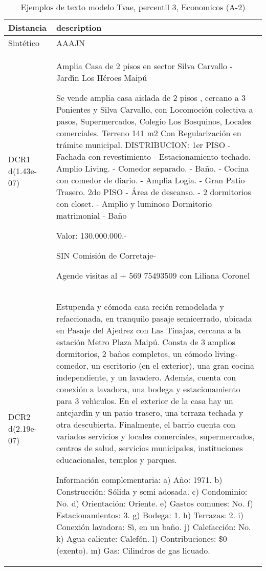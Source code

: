 \begin{table}[H]
\centering
\fontsize{10}{14}\selectfont
\caption{Ejemplos de texto modelo Tvae, percentil 3, Economicos (A-2)}
\label{table-example-economicos-a-2-tvae-3p-text}
\begin{tabular}{|l|m{35em}|}
\hline
\rowcolor[gray]{0.8}
Distancia & description \\
\hline Sintético & AAAJN \\
\hline DCR1 d(1.43e-07) & Amplia  Casa de 2 pisos en sector Silva Carvallo -  Jard{\'\i}n  Los H\'eroes Maip\'u 

Se vende amplia casa aislada de 2 pisos , cercano a  3 Ponientes y Silva Carvallo, con Locomoci\'on colectiva a pasos, Supermercados, Colegio Los Bosquinos, Locales comerciales.
Terreno 141 m2
Con Regularizaci\'on en tr\'amite municipal.
DISTRIBUCION:
1er PISO
- Fachada con revestimiento
- Estacionamiento techado.
-  Amplio Living.
- Comedor separado.
- Ba\~no.
- Cocina con comedor de diario.
- Amplia Logia.
- Gran Patio Trasero. 
2do PISO
- \'Area de descanso.
-  2 dormitorios con closet.
- Amplio y luminoso Dormitorio matrimonial
- Ba\~no 

Valor: 130.000.000.-  

    SIN  Comisi\'on de Corretaje-


Agende visitas al + 569 75493509 con Liliana Coronel \\
\hline DCR2 d(2.19e-07) & Estupenda y c\'omoda casa reci\'en remodelada y refaccionada, en tranquilo pasaje semicerrado, ubicada en Pasaje del Ajedrez con Las Tinajas, cercana a la estaci\'on Metro Plaza Maip\'u. Consta de 3 amplios dormitorios, 2 ba\~nos completos, un c\'omodo living-comedor, un escritorio (en el exterior), una gran cocina independiente, y un lavadero. Adem\'as, cuenta con conexi\'on a lavadora, una bodega y estacionamiento para 3 veh{\'\i}culos. En el exterior de la casa hay un antejard{\'\i}n y un patio trasero, una terraza techada y otra descubierta. Finalmente, el barrio cuenta con variados servicios y locales comerciales, supermercados, centros de salud, servicios municipales, instituciones educacionales, templos y parques.

Informaci\'on complementaria:
a)	A\~no: 1971.
b)	Construcci\'on: S\'olida y semi adosada.
c)	Condominio: No.
d)	Orientaci\'on: Oriente.
e)	Gastos comunes: No.
f)	Estacionamientos: 3.
g)	Bodega: 1.
h)	Terrazas: 2.
i)	Conexi\'on lavadora: S{\'\i}, en un ba\~no.
j)	Calefacci\'on: No.
k)	Agua caliente: Calef\'on.
l)	Contribuciones: \$0 (exento).
m)	Gas: Cilindros de gas licuado. \\
\hline
\end{tabular}
\end{table}
